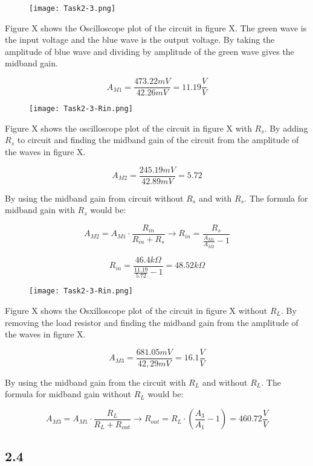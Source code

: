     \begin{figure}[h!]
        \centering
        \texttt{[image: Task2-3.png]}
    \end{figure}

	Figure X shows the Oscilloscope plot of the circuit in figure X. The green wave is the input voltage and the blue wave is the output voltage. By taking the amplitude of blue wave and dividing by amplitude of the green wave gives the midband gain.

	$$ A_{M1} = \frac{473.22 mV}{42.26 mV} = 11.19 \frac{V}{V} $$

\pagebreak

    \begin{figure}[h!]
        \centering
        \texttt{[image: Task2-3-Rin.png]}
    \end{figure}

	Figure X shows the oscilloscope plot of the circuit in figure X with $R_{s}$. By adding $R_{s}$ to circuit and finding the midband gain of the circuit from the amplitude of the waves in figure X.

	$$ A_{M2} = \frac{245.19 mV}{42.89 mV} = 5.72 $$

	By using the midband gain from circuit without $R_{s}$ and with $R_{s}$. The formula for midband gain with $R_{s}$ would be:  

	$$A_{M2} = A_{M1} \cdot \frac{R_{in}}{R_{in} + R_{s}} \rightarrow R_{in} = \frac{R_{s}}{\frac{A_{M1}}{A_{M2}}-1}  $$

	$$  R_{in} = \frac{46.4 k \Omega }{\frac{11.19}{5.72}-1} = 48.52 k \Omega$$ 

	\begin{figure}[h!]
        \centering
        \texttt{[image: Task2-3-Rin.png]}
    \end{figure}

	Figure X shows the Osxilloscope plot of the circuit in figure X without $R_{L}$. By removing the load resistor and finding the midband gain from the amplitude of the waves in figure X.


	$$ A_{M3} = \frac{681.05 mV}{42,29 mV} = 16.1 \frac{V}{V} $$

	By using the midband gain from the circuit with $R_{L}$ and without $R_{L}$. The formula for midband gain without $R_{L}$ would be:


	$$ A_{M3} = A_{M1} \cdot \frac{R_{L}}{R_{L} + R_{out}} \rightarrow R_{out} = R_{L} \cdot (\frac{A_{3}}{A_{1}}-1) = 460.72 \frac{V}{V}$$






\subsection*{2.4}
